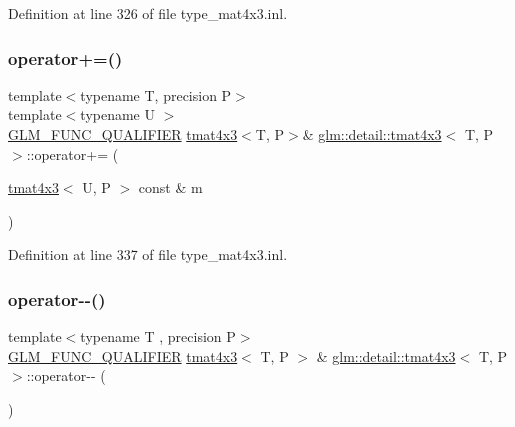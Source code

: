 Definition at line 326 of file type\+\_\+mat4x3.\+inl.

\mbox{\label{structglm_1_1detail_1_1tmat4x3_af8c2c8f9977ae873d3c26b5027363fcf}} 
\subsubsection{\texorpdfstring{operator+=()}{operator+=()}\hspace{0.1cm}{\footnotesize\ttfamily [4/4]}}
{\footnotesize\ttfamily template$<$typename T, precision P$>$ \\
template$<$typename U $>$ \\
\hyperlink{setup_8hpp_a33fdea6f91c5f834105f7415e2a64407}{G\+L\+M\+\_\+\+F\+U\+N\+C\+\_\+\+Q\+U\+A\+L\+I\+F\+I\+ER} \hyperlink{structglm_1_1detail_1_1tmat4x3}{tmat4x3}$<$T, P$>$\& \hyperlink{structglm_1_1detail_1_1tmat4x3}{glm\+::detail\+::tmat4x3}$<$ T, P $>$\+::operator+= (\begin{DoxyParamCaption}\item[{\hyperlink{structglm_1_1detail_1_1tmat4x3}{tmat4x3}$<$ U, P $>$ const \&}]{m }\end{DoxyParamCaption})}



Definition at line 337 of file type\+\_\+mat4x3.\+inl.

\mbox{\label{structglm_1_1detail_1_1tmat4x3_a9142d63a4f237f74fd5cc23a40f03453}} 
\subsubsection{\texorpdfstring{operator-\/-\/()}{operator--()}\hspace{0.1cm}{\footnotesize\ttfamily [1/2]}}
{\footnotesize\ttfamily template$<$typename T , precision P$>$ \\
\hyperlink{setup_8hpp_a33fdea6f91c5f834105f7415e2a64407}{G\+L\+M\+\_\+\+F\+U\+N\+C\+\_\+\+Q\+U\+A\+L\+I\+F\+I\+ER} \hyperlink{structglm_1_1detail_1_1tmat4x3}{tmat4x3}$<$ T, P $>$ \& \hyperlink{structglm_1_1detail_1_1tmat4x3}{glm\+::detail\+::tmat4x3}$<$ T, P $>$\+::operator-\/-\/ (\begin{DoxyParamCaption}{ }\end{DoxyParamCaption})}



